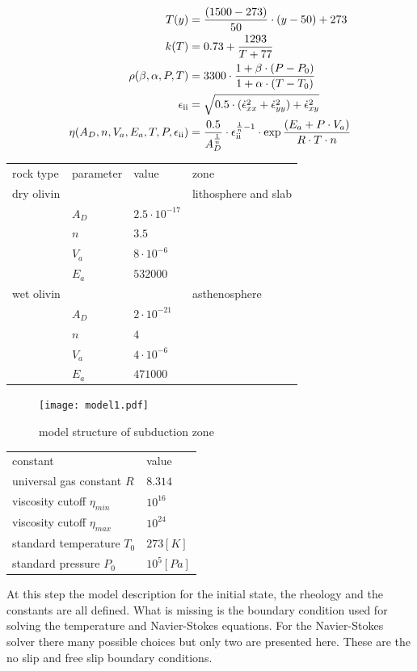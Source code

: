 \documentclass[12pt]{scrreprt}
\newcommand{\RN}[1]{%
  \textup{\uppercase\expandafter{\romannumeral#1}}%
}
\begin{document}
\begin{align}
T(y) &= \frac{(1500 - 273)}{50} \cdot (y - 50) + 273\\
k(T) &= 0.73 + \frac{1293}{T+77}\\
\rho(\beta,\alpha,P,T)&=3300\cdot \frac{1+\beta \cdot (P-P_0)}{1+\alpha \cdot (T-T_0)}\\
\epsilon_{\RN{2}}&=\sqrt{0.5\cdot(\dot{\epsilon}_{xx}^2+\dot{\epsilon}_{yy}^2)+\dot{\epsilon}_{xy}^2 }\\
\eta(A_D,n,V_a,E_a,T,P,\epsilon_{\RN{2}})&=\frac{0.5}{A_D^{\frac{1}{n}}}\cdot \epsilon_{\RN{2}}^{\frac{1}{n}-1}\cdot \exp{\frac{(E_a+P\cdot V_a)}{R\cdot T \cdot n}}
\end{align}

\begin{tabular}{llll}
rock type&parameter&value&zone\\
dry olivin&&&lithosphere and slab\\
&$A_D$&$2.5\cdot 10^{-17}$&\\
&$n$&$3.5$&\\
&$V_a$&$8\cdot 10^{-6}$&\\
&$E_a$&$532000$&\\
wet olivin&&&asthenosphere\\
&$A_D$&$2\cdot 10^{-21}$&\\
&$n$&$4$&\\
&$V_a$&$4\cdot 10^{-6}$&\\
&$E_a$&$471000$&\\
\end{tabular}

\begin{figure}
\texttt{[image: model1.pdf]}
\caption{model structure of subduction zone}
\label{fig:modelsubductionzone}
\end{figure}

\begin{tabular}{ll}
constant&value\\
universal gas constant $R$&$8.314$\\
viscosity cutoff $\eta_{min}$&$10^{16}$\\
viscosity cutoff $\eta_{max}$&$10^{24}$\\
standard temperature $T_0$&$273[K]$\\
standard pressure $P_0$&$10^5 [Pa]$\\
\end{tabular}

At this step the model description for the initial state, the rheology and the constants are all defined. What is missing is the boundary condition used for solving the temperature and Navier-Stokes equations. For the Navier-Stokes solver there many possible choices but only two are presented here. These are the no slip and free slip boundary conditions.
\end{document}
